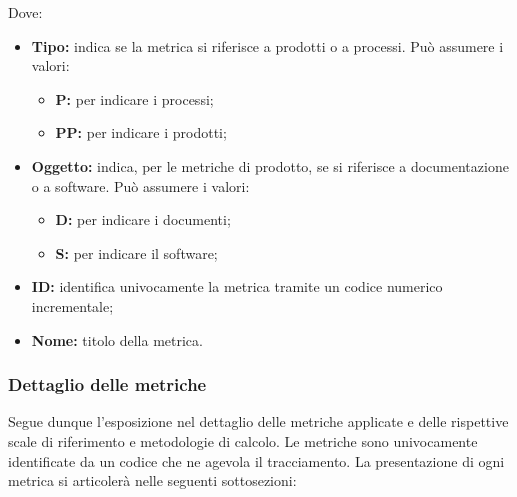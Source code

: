 \documentclass[../NormediProgetto.tex]{subfiles}
\begin{document}
Dove:

\begin{itemize}
    \item \textbf{Tipo:} indica se la metrica si riferisce a prodotti o a processi. Può assumere i valori:
    
    \begin{itemize}
        \item \textbf{P:} per indicare i processi;
        \item \textbf{PP:} per indicare i prodotti;
    \end{itemize}
    
    \item \textbf{Oggetto:} indica, per le metriche di prodotto, se si riferisce a documentazione o a software. Può assumere i valori:
    
    \begin{itemize}
        \item \textbf{D:} per indicare i documenti;
        \item \textbf{S:} per indicare il software;
    \end{itemize}
    
    \item \textbf{ID:} identifica univocamente la metrica tramite un codice numerico incrementale;
    
    \item \textbf{Nome:} titolo della metrica.
\end{itemize}

\subsubsection*{Dettaglio delle metriche}

Segue dunque l'esposizione nel dettaglio delle metriche applicate e delle rispettive scale di riferimento e metodologie di calcolo. Le metriche sono univocamente identificate da un codice che ne agevola il tracciamento. La presentazione di ogni metrica si articolerà nelle seguenti sottosezioni:
\end{document}
